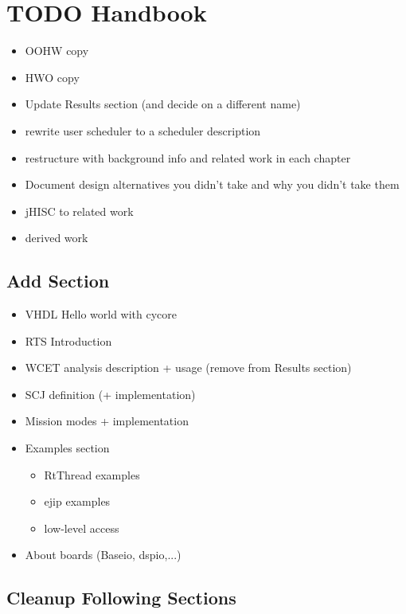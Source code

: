 \section{TODO Handbook}

\begin{itemize}
    \item OOHW copy
    \item HWO copy
    \item Update Results section (and decide on a different name)
    \item rewrite user scheduler to a scheduler description
    \item restructure with background info and related work in each
    chapter
    \item Document design alternatives you didn't take and why you
    didn't take them
    \item jHISC to related work
    \item derived work
\end{itemize}

\subsection{Add Section}

\begin{itemize}
    \item VHDL Hello world with cycore
    \item RTS Introduction
    \item WCET analysis description + usage (remove from Results
    section)
    \item SCJ definition (+ implementation)
    \item Mission modes + implementation
    \item Examples section
    \begin{itemize}
        \item RtThread examples
        \item ejip examples
        \item low-level access
    \end{itemize}
    \item About boards (Baseio, dspio,...)
\end{itemize}

\subsection{Cleanup Following Sections}

